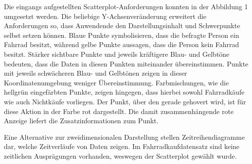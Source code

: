 \documentclass[usegeometry=true]{scrartcl}
\begin{document}
\newline Die eingangs aufgestellten Scatterplot-Anforderungen konnten in der Abbildung 1 umgesetzt werden. Die beliebige Y-Achsenveränderung  erweitert die Anforderungen so, dass Anwendende den Darstellungsinhalt und Schwerpunkte selbst setzen können. Blaue Punkte symbolisieren, dass die befragte Person ein Fahrrad besitzt, während gelbe Punkte aussagen, dass die Person kein Fahrrad besitzt. Stärker sichtbare Punkte und jeweils kräftigere Blau- und Gelbtöne bedeuten, dass die Daten in diesen Punkten miteinander übereinstimmen. Punkte mit jeweils schwächeren Blau- und Gelbtönen zeigen in dieser Koordinatenumgebung weniger Übereinstimmung. Farbmischungen, wie die hellgrün eingefärbten Punkte, zeigen hingegen, dass hierbei sowohl Fahrradkäufe wie auch Nichtkäufe vorliegen. Der Punkt, über den gerade gehovert wird, ist für diese Aktion in der Farbe rot dargestellt. Die damit zusammenhängende rote Anzeige liefert die Zusatzinformationen zum Punkt.

Eine Alternative zur zweidimensionalen Darstellung stellen Zeitreihendiagramme dar, welche Zeitverläufe von Daten zeigen. Im Fahrradkaufdatensatz sind keine zeitlichen Ausprägungen vorhanden, weswegen der Scatterplot gewählt wurde.
\end{document}
